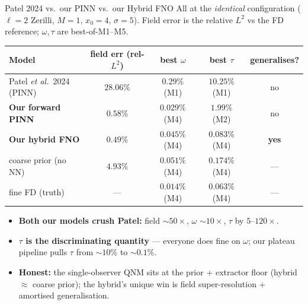 \documentclass[aspectratio=169, 11pt]{beamer}
\newcommand{\qnm}{QNM}
\newcommand{\zer}{Zerilli}
\begin{document}
\begin{frame}{Patel 2024 vs.\ our PINN vs.\ our Hybrid FNO}
  All at the \emph{identical} configuration ($\ell\!=\!2$ \zer{}, $M\!=\!1$, $x_0\!=\!4$, $\sigma\!=\!5$).
  Field error is the relative $L^2$ vs the FD reference; $\omega,\tau$ are best-of-M1--M5.
  \medskip
  \begin{center}\footnotesize
    \begin{tabular}{@{}lcccc@{}}
      \toprule
      \textbf{Model} & \textbf{field err (rel-$L^2$)} & \textbf{best $\omega$} & \textbf{best $\tau$} & \textbf{generalises?} \\
      \midrule
      Patel \emph{et al.}\ 2024 (PINN) & $28.06\%$ & $0.29\%$ (M1) & $10.25\%$ (M1) & no \\
      \textbf{Our forward PINN}        & $0.58\%$ & $\mathbf{0.029\%}$ (M4) & $1.99\%$ (M2) & no \\
      \rowcolor{green!10}
      \textbf{Our hybrid FNO}          & $0.49\%$ & $0.045\%$ (M4) & $\mathbf{0.083\%}$ (M4) & \textbf{yes} \\
      \midrule
      coarse prior (no NN) & $4.93\%$ & $0.051\%$ (M4) & $0.174\%$ (M4) & --- \\
      fine FD (truth) & --- & $0.014\%$ (M4) & $0.063\%$ (M4) & --- \\
      \bottomrule
    \end{tabular}
  \end{center}
  \medskip
  \begin{itemize}\small
    \item \textbf{Both our models crush Patel:} field $\sim\!50\times$, $\omega$ $\sim\!10\times$,
          $\tau$ by $5$--$120\times$.
    \item \textbf{$\tau$ is the discriminating quantity} --- everyone does fine on $\omega$;
          our plateau pipeline pulls $\tau$ from $\sim\!10\%$ to $\sim\!0.1\%$.
    \item \textbf{Honest:} the single-observer \qnm{} sits at the prior $+$ extractor floor
          (hybrid $\approx$ coarse prior); the hybrid's unique win is field super-resolution
          $+$ amortised generalisation.
  \end{itemize}
\end{frame}
\end{document}
